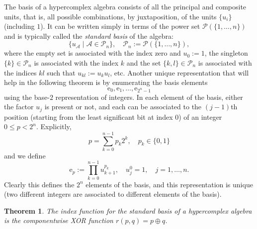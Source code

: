 \documentclass{article}
\newtheorem{theorem}{Theorem}
\begin{document}
The basis of a hypercomplex algebra consists of all the principal and composite units, that is, all possible combinations, by juxtaposition, of the units $\{ u_i \}$ (including $1$). It can be written simply in terms of the power set $\mathcal{P}(\{ 1, \ldots, n \})$ and is typically called the \textit{standard basis} of the algebra:
$$ \{ u_\mathcal{A} \mid \mathcal{A} \in \mathcal{P}_n \}, \quad \mathcal{P}_n := \mathcal{P}(\{ 1, \ldots, n \}), $$
where the empty set is associated with the index zero and $u_0 := 1$, the singleton $\{k\} \in \mathcal{P}_n$ is associated with the index $k$ and the set $\{ k,l \} \in \mathcal{P}_n$ is associated with the indices $kl$ such that $u_{kl} := u_k u_l$, etc. Another unique representation that will help in the following theorem is by enumerating the basis elements
$$ \mathrm e_0, \mathrm e_1, \ldots, \mathrm e_{2^n-1} $$
using the base-$2$ representation of integers. In each element of the basis, either the factor $u_j$ is present or not, and each can be associated to the $(j-1)$th position (starting from the least significant bit at index $0$) of an integer $0 \leq p < 2^n$. Explicitly,
$$ p = \sum_{k=0}^{n-1} p_k 2^k, \quad p_k \in \{0,1\} $$
and we define
\begin{equation}
    \label{XOR algebra : binary representation}
    \mathrm e_p := \prod_{k=0}^{n-1} u_{k+1}^{p_k}, \quad u_j^0 = 1, \quad j = 1,\ldots,n.
\end{equation}
Clearly this defines the $2^n$ elements of the basis, and this representation is unique (two different integers are associated to different elements of the basis).
\begin{theorem}
    \label{XOR algebra : XOR thm}
    The index function for the standard basis of a hypercomplex algebra is the componentwise XOR function $r(p,q) = p \oplus q$.
\end{theorem}
\end{document}
